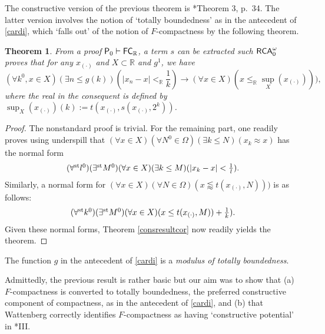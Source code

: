 \documentclass[reqno]{amsart}
\newtheorem{thm}{Theorem}
\newcommand\be{\begin{equation}}
\newcommand\ee{\end{equation}}
\def\RCAo{\textup{\textsf{RCA}}_{0}^{\omega}}
\def\P{\textup{\textsf{P}}}
\def\R{{\mathbb  R}}
\def\R{{\mathbb{R}}}
\def\st{\textup{st}}
\def\di{\rightarrow}
\def\FC{\textup{\textsf{FC}}}
\numberwithin{equation}{section}
\numberwithin{thm}{section}
\begin{document}
The constructive version of the previous theorem is \cite{bish1}*{Theorem 3, p.\ 34}.  The latter version involves the notion of `totally boundedness' as in the antecedent of \eqref{cardi}, which `falls out' of the notion of $F$-compactness by the following theorem.  
\begin{thm}
From a proof $\P_{0}\vdash \FC_{\R}$, a term $s$ can be extracted such $\RCAo$ proves that for any $x_{(\cdot)}$ and $X\subset \R$ and $g^{1}$, we have
\be\label{cardi}\textstyle
(\forall k^{0},  x\in X) (\exists n\leq g(k))(|x_{n}- x|<_{\R}\frac{1}{k})\di  (\forall x\in X)(x\leq_{\R} \sup_{X}(x_{(\cdot)}))),
\ee
where the real in the consequent is defined by $\sup_{X}(x_{(\cdot)} )(k):=t(x_{(\cdot)}, s(x_{(\cdot)}, 2^{k}))$.  
\end{thm}
\begin{proof}
The nonstandard proof is trivial.  For the remaining part, one readily proves using underspill that $(\forall x\in X)(\forall N^{0}\in \Omega) (\exists k\leq N)(x_{k}\approx x)$ has the normal form
\[\textstyle
(\forall^{\st} l^{0})(\exists^{\st}M^{0})(\forall x\in X) (\exists k\leq M)(|x_{k}- x|<\frac{1}{l}).
\]
Similarly, a normal form for $(\forall x\in X)(\forall N\in \Omega)(x\lessapprox t(x_{(\cdot)}, N)))$ is as follows:
\[\textstyle
(\forall^{\st}k^{0})(\exists^{\st} M^{0})(\forall x\in X)(x\leq  t(x_{(\cdot)}, M))+\frac{1}{k}).
\]
Given these normal forms, Theorem \ref{consresultcor} now readily yields the theorem.  
\end{proof}
The function $g$ in the antecedent of \eqref{cardi} is a \emph{modulus of totally boundedness}.  

\medskip

Admittedly, the previous result is rather basic but our aim was to show that (a) $F$-compactness is converted to totally boundedness, the preferred constructive component of compactness, as in the antecedent of \eqref{cardi}, and (b) that Wattenberg correctly identifies $F$-compactness as having `constructive potential' in \cite{watje}*{III}.  

\medskip
\end{document}
